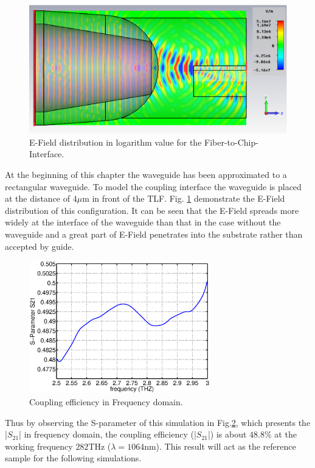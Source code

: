 \begin{figure}[!ht]
\centering
	\includegraphics[width=0.7 \textwidth]{bilder/cst_basic_waveguide_efield}
	\caption{E-Field distribution in logarithm value for the Fiber-to-Chip-Interface.}	
	\label{fig:coupling_e_field}
\end{figure}
At the beginning of this chapter the waveguide has been approximated to a rectangular waveguide. To model the coupling interface the waveguide is placed at the distance of $4\mu$m in front of the TLF.  Fig. \ref{fig:coupling_e_field} demonstrate the E-Field distribution of this configuration. It can be seen that the E-Field spreads more widely at the interface of the waveguide than that in the case without the waveguide and a great part of E-Field penetrates into the substrate rather than accepted by guide.\\
 
\begin{figure}[!ht]
\centering
\includegraphics[width=0.7\textwidth]{bilder/original_coupling_efficiency}
\caption{Coupling efficiency in Frequency domain.}
\label{fig:orignial_coupling_efficiency}
\end{figure}
Thus by observing the S-parameter of this simulation in Fig.\ref{fig:orignial_coupling_efficiency}, which presents the |$S_{21}$| in frequency domain, the coupling efficiency (|$S_{21}$|) is about $48.8\%$ at the working frequency $282$THz ($\lambda=1064$nm). This result will act as the reference sample for the following simulations.\\ 

